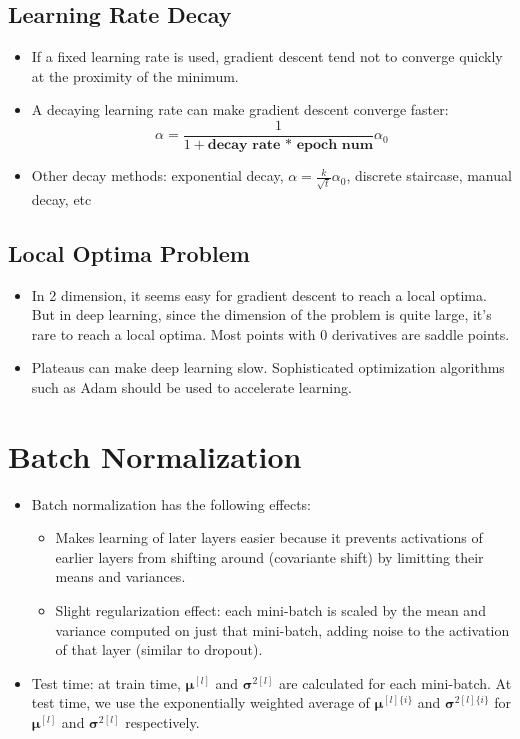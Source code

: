 \subsection{Learning Rate Decay}
\begin{itemize}
  \item If a fixed learning rate is used, gradient descent tend not to converge quickly at the proximity of the minimum.
  \item A decaying learning rate can make gradient descent converge faster:
  \[\alpha=\frac{1}{1+\textbf{decay rate * epoch num}}\alpha_0\]
  \item Other decay methods: exponential decay, $\alpha=\frac{k}{\sqrt{t}}\alpha_0$, discrete staircase, manual decay, etc
\end{itemize}
\subsection{Local Optima Problem}
\begin{itemize}
  \item In 2 dimension, it seems easy for gradient descent to reach a local optima. But in deep learning, since the dimension of the problem is quite large, it's rare to reach a local optima. Most points with 0 derivatives are saddle points.
  \item Plateaus can make deep learning slow. Sophisticated optimization algorithms such as Adam should be used to accelerate learning.
\end{itemize}
\section{Batch Normalization}
\begin{itemize}
  \item Batch normalization has the following effects:
  \begin{itemize}
    \item Makes learning of later layers easier because it prevents activations of earlier layers from shifting around (covariante shift) by limitting their means and variances. 
    \item Slight regularization effect: each mini-batch is scaled by the mean and variance computed on just that mini-batch, adding noise to the activation of that layer (similar to dropout). 
  \end{itemize}
  \item Test time: at train time, $\pmb{\mu}^{[l]}$ and $\pmb{\sigma}^{2[l]}$ are calculated for each mini-batch. At test time, we use the exponentially weighted average of $\pmb{\mu}^{[l]\{i\}}$ and $\pmb{\sigma}^{2[l]\{i\}}$ for $\pmb{\mu}^{[l]}$ and $\pmb{\sigma}^{2[l]}$ respectively.
\end{itemize}
